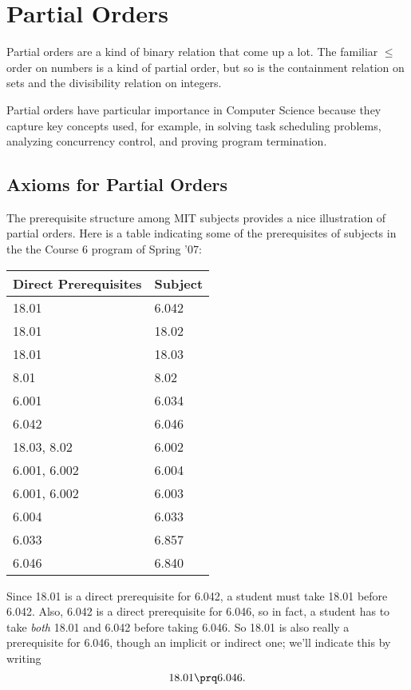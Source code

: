 
\chapter{Partial Orders}

Partial orders are a kind of binary relation that come up a lot.  The
familiar $\leq$ order on numbers is a kind of partial order, but so is the
containment relation on sets and the divisibility relation on integers.

Partial orders have particular importance in Computer Science because they
capture key concepts used, for example, in solving task scheduling
problems, analyzing concurrency control, and proving program termination.

\section{Axioms for Partial Orders}

The prerequisite structure among MIT subjects provides a nice illustration
of partial orders.  Here is a table indicating some of the prerequisites of
subjects in the the Course 6 program of Spring '07:
\begin{center}
\begin{tabular}{|l|l|}
\hline
Direct Prerequisites & Subject\\ \hline
18.01 & 6.042\\ \hline
 18.01 & 18.02\\ \hline
 18.01 & 18.03\\ \hline
 8.01 & 8.02\\ \hline
 6.001 & 6.034\\ \hline
 6.042 & 6.046\\ \hline
 18.03, 8.02 & 6.002\\ \hline
 6.001, 6.002 & 6.004\\ \hline
 6.001, 6.002 & 6.003\\ \hline
 6.004 & 6.033\\ \hline
 6.033 & 6.857\\ \hline
 6.046 & 6.840\\ \hline
\end{tabular}
\end{center}

Since 18.01 is a direct prerequisite for 6.042, a student must take 18.01
before 6.042.  Also, 6.042 is a direct prerequisite for 6.046, so in fact,
a student has to take \emph{both} 18.01 and 6.042 before taking 6.046.  So
18.01 is also really a prerequisite for 6.046, though an implicit or
indirect one; we'll indicate this by writing
\[
18.01 \prq 6.046.
\]

